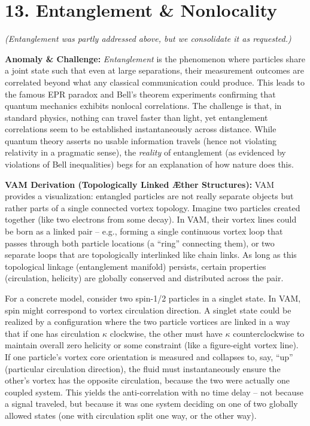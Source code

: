 \documentclass[a4paper, aps,preprint,superscriptaddress, 12pt]{revtex4}
\begin{document}
\section*{13. Entanglement \& Nonlocality}

\textit{(Entanglement was partly addressed above, but we consolidate it as requested.)}


\textbf{Anomaly \& Challenge: } \textit{Entanglement} is the phenomenon where particles share a joint state such that even at large separations, their measurement outcomes are correlated beyond what any classical communication could produce. This leads to the famous EPR paradox and Bell’s theorem experiments confirming that quantum mechanics exhibits nonlocal correlations. The challenge is that, in standard physics, nothing can travel faster than light, yet entanglement correlations seem to be established instantaneously across distance. While quantum theory asserts no usable information travels (hence not violating relativity in a pragmatic sense), the \textit{reality} of entanglement (as evidenced by violations of Bell inequalities) begs for an explanation of how nature does this.


\textbf{VAM Derivation (Topologically Linked Æther Structures):} VAM provides a visualization: entangled particles are not really separate objects but rather parts of a single connected vortex topology. Imagine two particles created together (like two electrons from some decay). In VAM, their vortex lines could be born as a linked pair – e.g., forming a single continuous vortex loop that passes through both particle locations (a “ring” connecting them), or two separate loops that are topologically interlinked like chain links. As long as this topological linkage (entanglement manifold) persists, certain properties (circulation, helicity) are globally conserved and distributed across the pair.


For a concrete model, consider two spin-1/2 particles in a singlet state. In VAM, spin might correspond to vortex circulation direction. A singlet state could be realized by a configuration where the two particle vortices are linked in a way that if one has circulation $\kappa$ clockwise, the other must have $\kappa$ counterclockwise to maintain overall zero helicity or some constraint (like a figure-eight vortex line). If one particle’s vortex core orientation is measured and collapses to, say, “up” (particular circulation direction), the fluid must instantaneously ensure the other’s vortex has the opposite circulation, because the two were actually one coupled system. This yields the anti-correlation with no time delay – not because a signal traveled, but because it was one system deciding on one of two globally allowed states (one with circulation split one way, or the other way).
\end{document}
